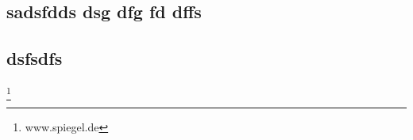 \documentclass[12pt,ngerman]{scrreprt}
\begin{document}
\begin{twocolumn}
\chapter{sadsfdds dsg dfg fd dffs}
\section{dsfsdfs}

\blindtext[2]\footnote{www.spiegel.de}
\blindtext[2]
\end{twocolumn}
\end{document}
